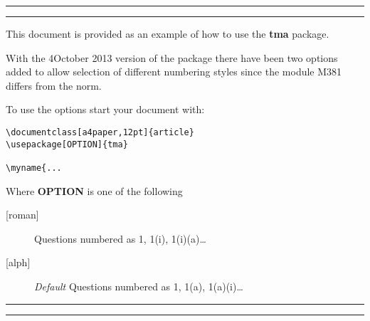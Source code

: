 \documentclass[a4paper,12pt]{article}
\begin{document}
\rule[0.4pt-1em]{0.4pt}{1em}\hrulefill\rule[0.4pt-1em]{0.4pt}{1em}

\begin{center}
\begin{minipage}{0.9\linewidth}
This document is provided as an example of how to use the \textbf{tma} package.

With the 4\nth October 2013 version of the package there have been two options added to allow selection of
different numbering styles since the module M381 differs from the norm.

To use the options start your document with:
\begin{verbatim}
\documentclass[a4paper,12pt]{article}
\usepackage[OPTION]{tma}

\myname{...
\end{verbatim}

Where \textbf{OPTION} is one of the following
\begin{description}
  \item[{[}roman{]}] Questions numbered as 1, 1(i), 1(i)(a)\dots
  \item[{[}alph{]}] \emph{Default} Questions numbered as 1, 1(a), 1(a)(i)\dots
\end{description}
\end{minipage}
\end{center}

\rule{0.4pt}{1em}\hrulefill\rule{0.4pt}{1em}
\end{document}
